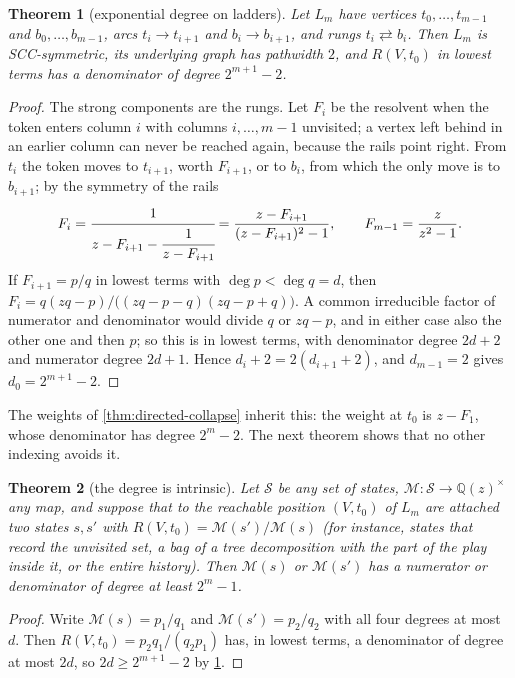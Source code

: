 \documentclass[11pt]{amsart}
\theoremstyle{plain}
\newtheorem{theorem}{Theorem}[section]
\theoremstyle{definition}
\theoremstyle{remark}
\numberwithin{equation}{section}
\newcommand{\QQ}{\mathbb{Q}}
\newcommand{\Qz}{\QQ(z)}
\newcommand{\Mpot}{\mathcal{M}}           %
\begin{document}
\begin{theorem}[exponential degree on ladders]\label{thm:ladders}
Let $L_m$ have vertices $t_0,\dots,t_{m-1}$ and $b_0,\dots,b_{m-1}$, arcs $t_i\to t_{i+1}$ and $b_i\to b_{i+1}$, and rungs $t_i\rightleftarrows b_i$. Then $L_m$ is SCC-symmetric, its underlying graph has pathwidth $2$, and $R(V,t_0)$ in lowest terms has a denominator of degree $2^{m+1}-2$.
\end{theorem}
\begin{proof}
The strong components are the rungs. Let $F_i$ be the resolvent when the token enters column $i$ with columns $i,\dots,m-1$ unvisited; a vertex left behind in an earlier column can never be reached again, because the rails point right. From $t_i$ the token moves to $t_{i+1}$, worth $F_{i+1}$, or to $b_i$, from which the only move is to $b_{i+1}$; by the symmetry of the rails
\[
F_i=\cfrac{1}{z-F_{i+1}-\cfrac{1}{z-F_{i+1}}}=\frac{z-F_{i+1}}{(z-F_{i+1})^{2}-1},\qquad F_{m-1}=\frac{z}{z^{2}-1}.
\]
If $F_{i+1}=p/q$ in lowest terms with $\deg p<\deg q=d$, then $F_i=q(zq-p)/\bigl((zq-p-q)(zq-p+q)\bigr)$. A common irreducible factor of numerator and denominator would divide $q$ or $zq-p$, and in either case also the other one and then $p$; so this is in lowest terms, with denominator degree $2d+2$ and numerator degree $2d+1$. Hence $d_i+2=2(d_{i+1}+2)$, and $d_{m-1}=2$ gives $d_0=2^{m+1}-2$.
\end{proof}

The weights of \cref{thm:directed-collapse} inherit this: the weight at $t_0$ is $z-F_1$, whose denominator has degree $2^{m}-2$. The next theorem shows that no other indexing avoids it.

\begin{theorem}[the degree is intrinsic]\label{thm:intrinsic-degree}
Let $\mathcal S$ be any set of states, $\Mpot\colon\mathcal S\to\Qz^{\times}$ any map, and suppose that to the reachable position $(V,t_0)$ of $L_m$ are attached two states $s,s'$ with $R(V,t_0)=\Mpot(s')/\Mpot(s)$ \textup{(}for instance, states that record the unvisited set, a bag of a tree decomposition with the part of the play inside it, or the entire history\textup{)}. Then $\Mpot(s)$ or $\Mpot(s')$ has a numerator or denominator of degree at least $2^{m}-1$.
\end{theorem}
\begin{proof}
Write $\Mpot(s)=p_1/q_1$ and $\Mpot(s')=p_2/q_2$ with all four degrees at most $d$. Then $R(V,t_0)=p_2q_1/(q_2p_1)$ has, in lowest terms, a denominator of degree at most $2d$, so $2d\ge2^{m+1}-2$ by \cref{thm:ladders}.
\end{proof}
\end{document}
